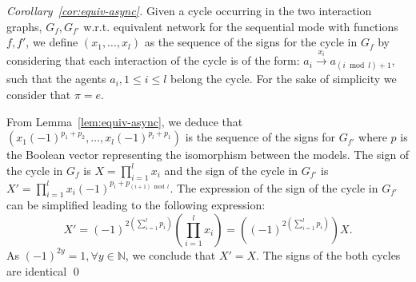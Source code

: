 \documentclass[12pt]{elsarticle}
\newcommand{\Nset}[0]{\mathbb{N}}
\newcommand{\wrt}[0]{w.r.t. }
\begin{document}
\begin{proof}[Corollary~\ref{cor:equiv-async}]
Given a cycle occurring in the two interaction graphs, $G_f,G_{f'}$ \wrt equivalent network for the sequential mode with functions $f,f'$, we define $(x_1,\ldots,x_{l})$ as the sequence of the signs for the cycle in $G_f$ by considering that each interaction of the cycle is of the form: $a_i \stackrel{x_i}{\longrightarrow} a_{(i \bmod l)+1}$, such that the agents $a_i, 1 \leq i \leq l$ belong the cycle. For the sake of simplicity we consider that $\pi=e$.

\medskip
\noindent
From Lemma~\ref{lem:equiv-async}, we deduce that $( x_1(-1)^{p_1 + p_2}, \ldots, x_l(-1)^{p_{l}+p_1})$ is the sequence of the signs for $G_{f'}$ where $p$ is the Boolean vector representing the isomorphism between the models. The sign of the cycle in $G_f$ is $X= \prod_{i=1}^l x_i$ and the sign of the cycle in $G_{f'}$ is $X'=\prod_{i=1}^l x_i(-1)^{p_i+p_{(i+1) \bmod l}}$. The expression of the sign of the cycle in $G_{f'}$ can be simplified leading to the following expression:
 $$ X'=(-1)^{2 \left(\sum_{i=1}^l p_i\right)}\left(\prod_{i=1}^l x_i \right)= \left((-1)^{2 \left(\sum_{i=1}^l p_i\right)}\right)X. $$
As $(-1)^{2 y} = 1, \forall y \in \Nset$, we conclude that $X'=X$. The signs of the both cycles are identical \qed 
\end{proof}
\end{document}
